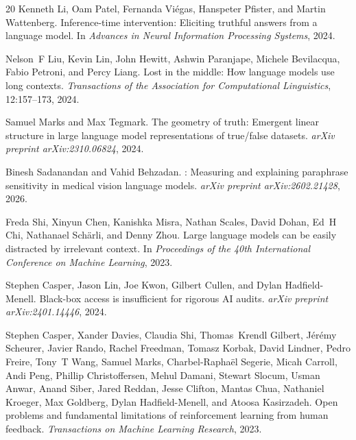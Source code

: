\documentclass[10pt,twocolumn]{article}
\begin{document}
\begin{thebibliography}{20}
Kenneth Li, Oam Patel, Fernanda Vi\'egas, Hanspeter Pfister, and Martin Wattenberg.
\newblock Inference-time intervention: Eliciting truthful answers from a language model.
\newblock In \emph{Advances in Neural Information Processing Systems}, 2024.

Nelson~F Liu, Kevin Lin, John Hewitt, Ashwin Paranjape, Michele Bevilacqua, Fabio Petroni, and Percy Liang.
\newblock Lost in the middle: How language models use long contexts.
\newblock \emph{Transactions of the Association for Computational Linguistics}, 12:157--173, 2024.

Samuel Marks and Max Tegmark.
\newblock The geometry of truth: Emergent linear structure in large language model representations of true/false datasets.
\newblock \emph{arXiv preprint arXiv:2310.06824}, 2024.

Binesh Sadanandan and Vahid Behzadan.
: Measuring and explaining paraphrase sensitivity in medical vision language models.
\newblock \emph{arXiv preprint arXiv:2602.21428}, 2026.

Freda Shi, Xinyun Chen, Kanishka Misra, Nathan Scales, David Dohan, Ed~H Chi, Nathanael Sch{\"a}rli, and Denny Zhou.
\newblock Large language models can be easily distracted by irrelevant context.
\newblock In \emph{Proceedings of the 40th International Conference on Machine Learning}, 2023.

Stephen Casper, Jason Lin, Joe Kwon, Gilbert Cullen, and Dylan Hadfield-Menell.
\newblock Black-box access is insufficient for rigorous {AI} audits.
\newblock \emph{arXiv preprint arXiv:2401.14446}, 2024.

Stephen Casper, Xander Davies, Claudia Shi, Thomas~Krendl Gilbert, J{\'e}r{\'e}my Scheurer, Javier Rando, Rachel Freedman, Tomasz Korbak, David Lindner, Pedro Freire, Tony~T Wang, Samuel Marks, Charbel-Rapha{\"e}l Segerie, Micah Carroll, Andi Peng, Phillip Christoffersen, Mehul Damani, Stewart Slocum, Usman Anwar, Anand Siber, Jared Reddan, Jesse Clifton, Mantas Chua, Nathaniel Kroeger, Max Goldberg, Dylan Hadfield-Menell, and Atoosa Kasirzadeh.
\newblock Open problems and fundamental limitations of reinforcement learning from human feedback.
\newblock \emph{Transactions on Machine Learning Research}, 2023.


\end{thebibliography}
\end{document}
